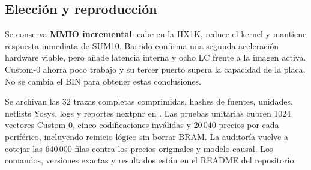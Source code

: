 \subsection{Elección y reproducción}
Se conserva \textbf{MMIO incremental}: cabe en la HX1K, reduce el kernel y
mantiene respuesta inmediata de SUM10. Barrido confirma una segunda aceleración
hardware viable, pero añade latencia interna y ocho LC frente a la imagen activa.
Custom-0 ahorra poco trabajo y su tercer puerto supera la capacidad de la placa.
No se cambia el BIN para obtener estas conclusiones.

Se archivan las 32 trazas completas comprimidas, hashes de fuentes, unidades,
netlists Yosys, logs y reportes nextpnr en
. Las pruebas unitarias cubren 1024
vectores Custom-0, cinco codificaciones inválidas y 20\,040 precios por cada
periférico, incluyendo reinicio lógico sin borrar BRAM. La auditoría vuelve a
cotejar las 640\,000 filas contra los precios originales y modelo causal.
Los comandos, versiones exactas y resultados están en el README del repositorio.
